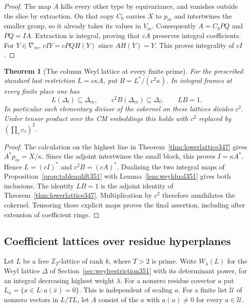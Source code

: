 \documentclass[a4paper,11pt]{article}
\newtheorem{theorem}[proposition]{Theorem}
\theoremstyle{definition}
\theoremstyle{remark}
\numberwithin{equation}{section}
\begin{document}
\begin{proof}
The map \(A\) kills every other type by equivariance, and
vanishes outside the slice by extraction. On that copy
\(C_b\) carries \(X\) to \(p_m\) and intertwines the smaller
group, so it already takes its values in \(V_m\). Consequently
\(A=C_b P Q\) and \(P Q=I A\). Extraction is integral, proving
that \(cA\) preserves integral coefficients. For \(Y\in\nabla_m\),
\(cIY=cPQH(Y)\) since \(A H(Y)=Y\). This proves integrality
of \(cI\).
\end{proof}

\begin{theorem}[The column Weyl lattice at every finite prime]\leavevmode
\label{thm:weyllower351}
For the prescribed standard last restriction \(L=c\kappa A\),
put \(B=L^*/(c^2\kappa)\). In integral frames at every finite
place one has
\[
       L(\Delta_l)\subseteq\Delta_m,\qquad
       c^2 B(\Delta_m)\subseteq\Delta_l,\qquad LB=1 .
\]
In particular each elementary divisor of the cokernel on these
lattices divides \(c^2\). Under tensor product over the CM
embeddings this holds with \(c^2\) replaced by
\((\prod_\tau c_\tau)^2\).
\end{theorem}
\begin{proof}
The calculation on the highest line in
Theorem~\ref{thm:lowerlattice347} gives \(A^*p_m=X/\kappa\).
Since the adjoint intertwines the small block, this proves
\(I=\kappa A^*\). Hence \(L=(cI)^*\) and \(c^2B=(cA)^*\).
Dualizing the two integral maps of Proposition~\ref{prop:tableaulift351}
with Lemma~\ref{lem:weyldual351} gives both inclusions.
The identity \(LB=1\) is the adjoint identity of
Theorem~\ref{thm:lowerlattice347}. Multiplication by \(c^2\)
therefore annihilates the cokernel. Tensoring these explicit
maps proves the final assertion, including after extension of
coefficient rings.
\end{proof}


\subsection{Coefficient lattices over residue hyperplanes}\label{sec:openflags353}

Let \(L\) be a free \(\mathbb Z_T\)-lattice of rank \(k\),
where \(T>2\) is prime. Write \(W_\lambda(L)\) for the Weyl
lattice \(\Delta\) of Section~\ref{sec:weylrestriction351} with
its determinant power, for an integral decreasing highest
weight \(\lambda\). For a nonzero residue covector \(a\) put
\(L_a=\{x\in L:a(\bar x)=0\}\). This is independent of scaling
\(a\). For a finite list \(\mathcal U\) of nonzero vectors in
\(L/TL\), let \(A\) consist of the \(a\) with \(a(u)\ne0\)
for every \(u\in\mathcal U\).
\end{document}
